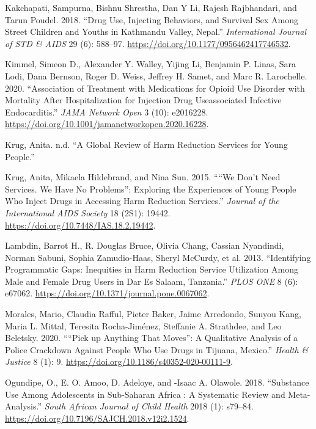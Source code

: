 \documentclass[
  letterpaper,
  DIV=11,
  numbers=noendperiod]{scrartcl}
\newlength{\cslhangindent}
\newenvironment{CSLReferences}[2] %
 {\begin{list}{}{%
  \setlength{\itemindent}{0pt}
  \setlength{\leftmargin}{0pt}
  \setlength{\parsep}{0pt}
  \ifodd #1
   \setlength{\leftmargin}{\cslhangindent}
   \setlength{\itemindent}{-1\cslhangindent}
  \fi
  \setlength{\itemsep}{#2\baselineskip}}}
 {\end{list}}
\begin{document}
\begin{CSLReferences}{1}{0}
Kakchapati, Sampurna, Bishnu Shrestha, Dan Y Li, Rajesh Rajbhandari, and
Tarun Poudel. 2018. {``Drug Use, Injecting Behaviors, and Survival Sex
Among Street Children and Youths in Kathmandu Valley, Nepal.''}
\emph{International Journal of STD \& AIDS} 29 (6): 588--97.
\url{https://doi.org/10.1177/0956462417746532}.

Kimmel, Simeon D., Alexander Y. Walley, Yijing Li, Benjamin P. Linas,
Sara Lodi, Dana Bernson, Roger D. Weiss, Jeffrey H. Samet, and Marc R.
Larochelle. 2020. {``Association of Treatment with Medications for
Opioid Use Disorder with Mortality After Hospitalization for Injection
Drug Use{\textendash}associated Infective Endocarditis.''} \emph{JAMA
Network Open} 3 (10): e2016228.
\url{https://doi.org/10.1001/jamanetworkopen.2020.16228}.

Krug, Anita. n.d. {``A Global Review of Harm Reduction Services for
Young People.''}

Krug, Anita, Mikaela Hildebrand, and Nina Sun. 2015. {``{``}We Don't
Need Services. We Have No Problems{''}: Exploring the Experiences of
Young People Who Inject Drugs in Accessing Harm Reduction Services.''}
\emph{Journal of the International AIDS Society} 18 (2S1): 19442.
\url{https://doi.org/10.7448/IAS.18.2.19442}.

Lambdin, Barrot H., R. Douglas Bruce, Olivia Chang, Cassian Nyandindi,
Norman Sabuni, Sophia Zamudio-Haas, Sheryl McCurdy, et al. 2013.
{``Identifying Programmatic Gaps: Inequities in Harm Reduction Service
Utilization Among Male and Female Drug Users in Dar Es Salaam,
Tanzania.''} \emph{PLOS ONE} 8 (6): e67062.
\url{https://doi.org/10.1371/journal.pone.0067062}.

Morales, Mario, Claudia Rafful, Pieter Baker, Jaime Arredondo, Sunyou
Kang, Maria L. Mittal, Teresita Rocha-Jiménez, Steffanie A. Strathdee,
and Leo Beletsky. 2020. {``{``}Pick up Anything That Moves{''}: A
Qualitative Analysis of a Police Crackdown Against People Who Use Drugs
in Tijuana, Mexico.''} \emph{Health \& Justice} 8 (1): 9.
\url{https://doi.org/10.1186/s40352-020-00111-9}.

Ogundipe, O., E. O. Amoo, D. Adeloye, and -Isaac A. Olawole. 2018.
{``Substance Use Among Adolescents in Sub-Saharan Africa : A Systematic
Review and Meta-Analysis.''} \emph{South African Journal of Child
Health} 2018 (1): s79--84.
\url{https://doi.org/10.7196/SAJCH.2018.v12i2.1524}.


\end{CSLReferences}
\end{document}
